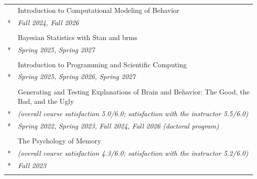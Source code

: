 \documentclass[letterpaper]{article}
\begin{document}
\begin{longtable}{rl}
       & Introduction to Computational Modeling of Behavior                                                       \\*
       & {\it Fall 2024, Fall 2026}                                                                               \\
       &                                                                                                          \\
       & Bayesian Statistics with Stan and brms                                                                   \\*
       & {\it Spring 2025, Spring 2027}                                                                           \\
       &                                                                                                          \\
       & Introduction to Programming and Scientific Computing                                                     \\*
       & {\it Spring 2025, Spring 2026, Spring 2027}                                                              \\
       &                                                                                                          \\
       & Generating and Testing Explanations of Brain and Behavior: The Good, the Bad, and the Ugly               \\*
       & {\it (overall course satisfaction 5.0/6.0; satisfaction with the instructor 5.5/6.0)}                    \\*
       & {\it Spring 2022, Spring 2023, Fall 2024, Fall 2026 (doctoral program)}                                  \\
       &                                                                                                          \\
       & The Psychology of Memory                                                                                 \\*
       & {\it (overall course satisfaction 4.3/6.0; satisfaction with the instructor 5.2/6.0)}                    \\*
       & {\it Fall 2023}                                                                                          \\
       &                                                                                                          \\

\end{longtable}
\end{document}
